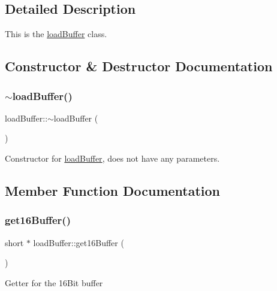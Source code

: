 \subsection{Detailed Description}
This is the \hyperlink{classloadBuffer}{load\+Buffer} class. 

\subsection{Constructor \& Destructor Documentation}
\mbox{\label{classloadBuffer_a569f285c4f37d2880c1619842d54917a}} 
\subsubsection{\texorpdfstring{$\sim$load\+Buffer()}{~loadBuffer()}}
{\footnotesize\ttfamily load\+Buffer\+::$\sim$load\+Buffer (\begin{DoxyParamCaption}{ }\end{DoxyParamCaption})\hspace{0.3cm}{\ttfamily [virtual]}}

Constructor for \hyperlink{classloadBuffer}{load\+Buffer}, does not have any parameters. 

\subsection{Member Function Documentation}
\mbox{\label{classloadBuffer_aa6b14cb999de76cfce307f7036310859}} 
\subsubsection{\texorpdfstring{get16\+Buffer()}{get16Buffer()}}
{\footnotesize\ttfamily short $\ast$ load\+Buffer\+::get16\+Buffer (\begin{DoxyParamCaption}{ }\end{DoxyParamCaption})}

Getter for the 16\+Bit buffer \mbox{\label{classloadBuffer_ace04b355c2b23c72abd1d322dcb960ee}} 
